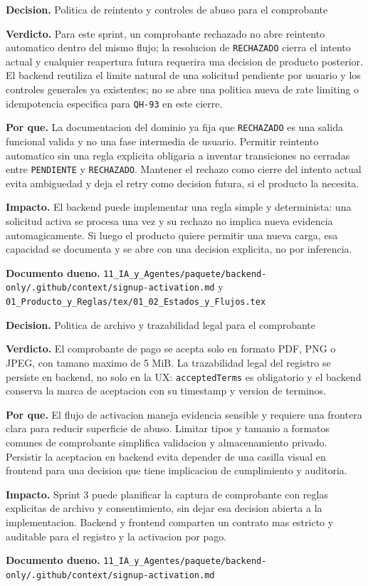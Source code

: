 \begin{docnote}
\textbf{Decision.} Politica de reintento y controles de abuso para el comprobante

\textbf{Verdicto.} Para este sprint, un comprobante rechazado no abre reintento automatico dentro del mismo flujo; la resolucion de \texttt{RECHAZADO} cierra el intento actual y cualquier reapertura futura requerira una decision de producto posterior. El backend reutiliza el limite natural de una solicitud pendiente por usuario y los controles generales ya existentes; no se abre una politica nueva de rate limiting o idempotencia especifica para \texttt{QH-93} en este cierre.

\textbf{Por que.} La documentacion del dominio ya fija que \texttt{RECHAZADO} es una salida funcional valida y no una fase intermedia de usuario. Permitir reintento automatico sin una regla explicita obligaria a inventar transiciones no cerradas entre \texttt{PENDIENTE} y \texttt{RECHAZADO}. Mantener el rechazo como cierre del intento actual evita ambiguedad y deja el retry como decision futura, si el producto la necesita.

\textbf{Impacto.} El backend puede implementar una regla simple y determinista: una solicitud activa se procesa una vez y su rechazo no implica nueva evidencia automagicamente. Si luego el producto quiere permitir una nueva carga, esa capacidad se documenta y se abre con una decision explicita, no por inferencia.

\textbf{Documento dueno.} \texttt{11\_IA\_y\_Agentes/paquete/backend-only/.github/context/signup-activation.md} y \texttt{01\_Producto\_y\_Reglas/tex/01\_02\_Estados\_y\_Flujos.tex}
\end{docnote}

\begin{docnote}
\textbf{Decision.} Politica de archivo y trazabilidad legal para el comprobante

\textbf{Verdicto.} El comprobante de pago se acepta solo en formato PDF, PNG o JPEG, con tamano maximo de 5 MiB. La trazabilidad legal del registro se persiste en backend, no solo en la UX: \texttt{acceptedTerms} es obligatorio y el backend conserva la marca de aceptacion con su timestamp y version de terminos.

\textbf{Por que.} El flujo de activacion maneja evidencia sensible y requiere una frontera clara para reducir superficie de abuso. Limitar tipos y tamanio a formatos comunes de comprobante simplifica validacion y almacenamiento privado. Persistir la aceptacion en backend evita depender de una casilla visual en frontend para una decision que tiene implicacion de cumplimiento y auditoria.

\textbf{Impacto.} Sprint 3 puede planificar la captura de comprobante con reglas explicitas de archivo y consentimiento, sin dejar esa decision abierta a la implementacion. Backend y frontend comparten un contrato mas estricto y auditable para el registro y la activacion por pago.

\textbf{Documento dueno.} \texttt{11\_IA\_y\_Agentes/paquete/backend-only/.github/context/signup-activation.md}
\end{docnote}

